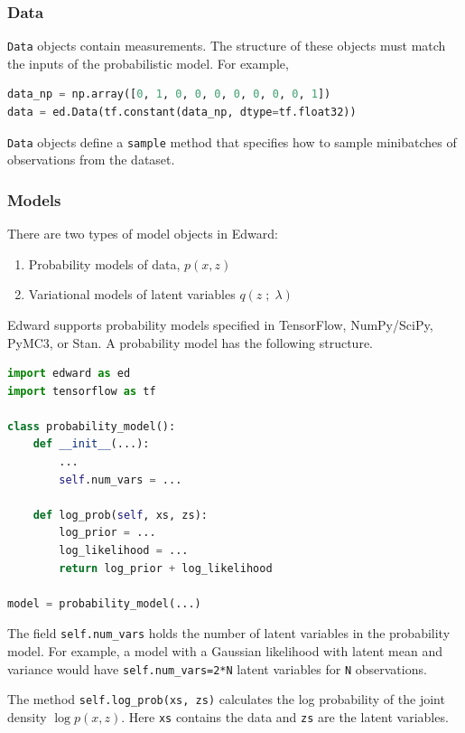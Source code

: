 \subsubsection{Data}

\texttt{Data} objects contain measurements. The structure of these objects must
match the inputs of the probabilistic model. For example, 

\begin{lstlisting}[language=Python]
data_np = np.array([0, 1, 0, 0, 0, 0, 0, 0, 0, 1])
data = ed.Data(tf.constant(data_np, dtype=tf.float32))
\end{lstlisting}

\texttt{Data} objects define a \texttt{sample} method that specifies how to
sample minibatches of observations from the dataset.

\subsubsection{Models}\label{models}

There are two types of model objects in Edward:

\begin{enumerate}
\def\labelenumi{\arabic{enumi}.}
\tightlist
\item
  Probability models of data, $p(x,z)$
\item
  Variational models of latent variables $q(z\;;\;\lambda)$
\end{enumerate}

Edward supports probability models specified in TensorFlow, NumPy/SciPy, PyMC3,
or Stan. A probability model has the following structure.
\begin{lstlisting}[language=Python]
import edward as ed
import tensorflow as tf

class probability_model():
    def __init__(...):
        ...
        self.num_vars = ...
 
    def log_prob(self, xs, zs):
        log_prior = ...
        log_likelihood = ...
        return log_prior + log_likelihood

model = probability_model(...)
\end{lstlisting}
The field \texttt{self.num\_vars} holds the number of latent variables in the
probability model. For example, a model with a Gaussian likelihood with latent
mean and variance would have \texttt{self.num\_vars=2*N} latent variables for 
\texttt{N} observations.

The method \texttt{self.log_prob(xs, zs)} calculates the log probability of the
joint density $\log p(x,z)$. Here \texttt{xs} contains the data and \texttt{zs}
are the latent variables.

